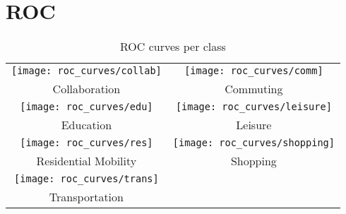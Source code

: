 \chapter{ROC}\label{app:ROC-curves}
    \begin{table}
        \centering
        \begin{tabular}{cc}
            \texttt{[image: roc\_curves/collab]}& \texttt{[image: roc\_curves/comm]} \\ 
            Collaboration & Commuting \\
            \texttt{[image: roc\_curves/edu]} & \texttt{[image: roc\_curves/leisure]} \\
            Education & Leisure \\
            \texttt{[image: roc\_curves/res]} & \texttt{[image: roc\_curves/shopping]} \\
            Residential Mobility & Shopping \\
            \texttt{[image: roc\_curves/trans]} & \\
             Transportation &  \\
        \end{tabular}
        \caption{ROC curves per class}
        \label{tbl:table_of_figures}
    \end{table}
